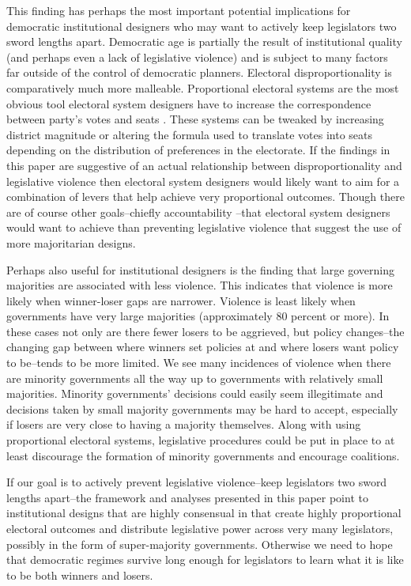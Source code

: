 \documentclass[a4paper]{article}\usepackage{graphicx, color}
\begin{document}
{{This finding has perhaps the most important potential implications for democratic institutional designers who may want to actively keep legislators two sword lengths apart. Democratic age is partially the result of institutional quality (and perhaps even a lack of legislative violence) and is subject to many factors far outside of the control of democratic planners. Electoral disproportionality is comparatively much more malleable. Proportional electoral systems are the most obvious tool electoral system designers have to increase the correspondence between party's votes and seats \citep{Carey2011}. These systems can be tweaked by increasing district magnitude or altering the formula used to translate votes into seats depending on the distribution of preferences in the electorate. If the findings in this paper are suggestive of an actual relationship between disproportionality and legislative violence then electoral system designers would likely want to aim for a combination of levers that help achieve very proportional outcomes. Though there are of course other goals--chiefly accountability \citep{Lijphart1984, Powell2000}--that electoral system designers would want to achieve than preventing legislative violence that suggest the use of more majoritarian designs. 

Perhaps also useful for institutional designers is the finding that large governing majorities are associated with less violence. This indicates that violence is more likely when winner-loser gaps are narrower. Violence is least likely when governments have very large majorities (approximately 80 percent or more). In these cases not only are there fewer losers to be aggrieved, but policy changes--the changing gap between where winners set policies at and where losers want policy to be--tends to be more limited. We see many incidences of violence when there are minority governments all the way up to governments with relatively small majorities. Minority governments' decisions could easily seem illegitimate and decisions taken by small majority governments may be hard to accept, especially if losers are very close to having a majority themselves. Along with using proportional electoral systems, legislative procedures could be put in place to at least discourage the formation of minority governments and encourage coalitions. %

If our goal is to actively prevent legislative violence--keep legislators two sword lengths apart--the framework and analyses presented in this paper point to institutional designs that are highly consensual in that create highly proportional electoral outcomes and distribute legislative power across very many legislators, possibly in the form of super-majority governments. Otherwise we need to hope that democratic regimes survive long enough for legislators to learn what it is like to be both winners and losers.

}}
\end{document}
